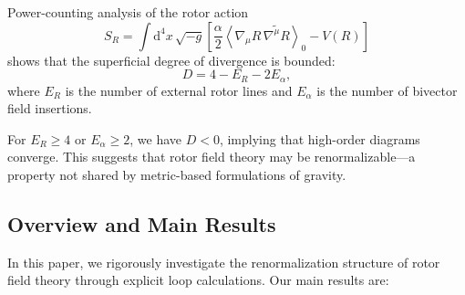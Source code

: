 \documentclass[11pt,a4paper]{article}
\numberwithin{equation}{section}
\theoremstyle{plain}
\theoremstyle{definition}
\theoremstyle{remark}
\newcommand{\dd}{\mathrm{d}}
\newcommand{\rev}[1]{\widetilde{#1}}        %
\newcommand{\grade}[2]{\left\langle #1 \right\rangle_{#2}}
\begin{document}
Power-counting analysis of the rotor action
\begin{equation}
S_R = \int \dd^4x\,\sqrt{-g}\left[\frac{\alpha}{2}\grade{\nabla_\mu R\,\rev{\nabla^\mu R}}{0} - V(R)\right]
\label{eq:action-rotor}
\end{equation}
shows that the superficial degree of divergence is bounded:
\begin{equation}
D = 4 - E_R - 2E_\alpha,
\label{eq:power-counting}
\end{equation}
where $E_R$ is the number of external rotor lines and $E_\alpha$ is the number of bivector field insertions.

For $E_R\geq 4$ or $E_\alpha\geq 2$, we have $D<0$, implying that high-order diagrams converge. This suggests that rotor field theory may be renormalizable---a property not shared by metric-based formulations of gravity.

\subsection{Overview and Main Results}

In this paper, we rigorously investigate the renormalization structure of rotor field theory through explicit loop calculations. Our main results are:
\end{document}
